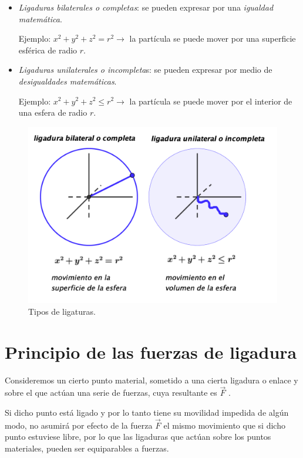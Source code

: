 \vspace{-2mm} %
\begin{itemize}

\item \emph{Ligaduras bilaterales o completas}:	 se pueden expresar por una \emph{igualdad matemática}.

Ejemplo: $x^2+y^2+z^2=r^2 \to $ la partícula se puede mover por una superficie esférica de radio $r$.

\item \emph{Ligaduras unilaterales o incompleta}s: se pueden expresar por medio de \emph{desigualdades matemáticas}.

Ejemplo: $x^2+y^2+z^2 \le r^2 \to $ la partícula se puede mover por el interior de una esfera de radio $r$.

\end{itemize}

\vspace{-4mm} %
\begin{figure}[H]
	\centering
	\includegraphics[width=.7\textwidth]{imagenes/imagenes05/T05IM01.png}
	\caption*{Tipos de ligaturas.}
\end{figure}

\section{Principio de las fuerzas de ligadura}

Consideremos un cierto punto material, sometido a una cierta ligadura o enlace y sobre el que actúan una serie de fuerzas, cuya resultante es $\overrightarrow{F}$ . 

Si dicho punto está  ligado y por lo tanto tiene su movilidad impedida de algún  modo, no asumirá por efecto de la fuerza  $\overrightarrow{F}$ el mismo movimiento que si dicho punto estuviese libre, por lo que las ligaduras que actúan sobre los puntos materiales, pueden ser equiparables a fuerzas.
 
